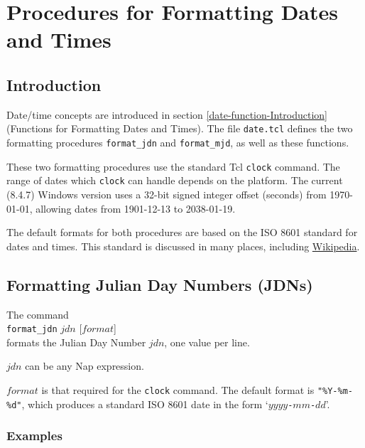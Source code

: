 
\section{Procedures for Formatting Dates and Times}
    \label{date-proc}

\subsection{Introduction}
    \label{date-proc-Introduction}

Date/time concepts are introduced in 
section \ref{date-function-Introduction} (Functions for Formatting Dates and Times).
The file 
  \texttt{date.tcl} defines the two formatting procedures 
  \texttt{format\_jdn} and 
  \texttt{format\_mjd}, as well as these functions.

These two formatting procedures use the standard Tcl 
  \texttt{clock} command. The range of dates which 
  \texttt{clock} can handle depends on the platform. The current
  (8.4.7) Windows version uses a 32-bit signed integer offset (seconds)
  from 1970-01-01, allowing dates from 1901-12-13 to 2038-01-19.

The default formats for both procedures are based on the ISO 8601 standard for dates and times.
This standard is discussed in many places, including
\href{http://en.wikipedia.org/wiki/ISO_8601}{Wikipedia}.

\subsection{Formatting Julian Day Numbers (JDNs)}
    \label{date-proc-format-jdn}

The command
  \\
  \texttt{format\_jdn} $\mathit{jdn}$ [$\mathit{format}$]
  \\formats the Julian Day Number 
  $\mathit{jdn}$, one value per line.

  $\mathit{jdn}$ can be any Nap expression.

  $\mathit{format}$ is that required for the 
  \texttt{clock} command. The default format is 
  \texttt{"\%Y-\%m-\%d"}, which produces a standard ISO 8601
  date in the form `\texttt{$\mathit{yyyy}$-$\mathit{mm}$-$\mathit{dd}$}'.

\subsubsection{Examples}

